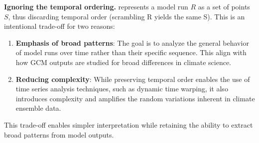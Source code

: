 \vspace{3pt}
\noindent\textbf{Ignoring the temporal ordering.}
\ClimateSOM represents a model run $R$ as a set of points $S$, thus discarding temporal order (scrambling R yields the same S). This is an intentional trade-off for two reasons:
\begin{enumerate}[noitemsep, topsep=0pt]
    \item \textbf{Emphasis of broad patterns}: The goal is to analyze the general behavior of model runs over time rather than their specific sequence. This align with how GCM outputs are studied for broad differences in climate science.
    \item \textbf{Reducing complexity}: While preserving temporal order enables the use of time series analysis techniques, such as dynamic time warping, it also introduces complexity and amplifies the random variations inherent in climate ensemble data.
\end{enumerate}
This trade-off enables simpler interpretation while retaining the ability to extract broad patterns from model outputs.
%
